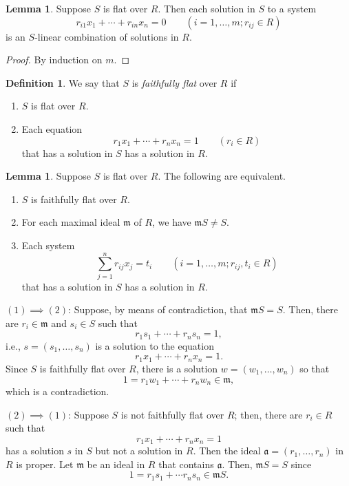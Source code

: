 \documentclass[12pt]{article}
\theoremstyle{theorem}            %
\theoremstyle{definition}           %
\newtheorem{definition}[theorem]{Definition}
\newtheorem{lemma}[theorem]{Lemma}
\theoremstyle{empty}
\begin{document}
\begin{lemma} Suppose $S$ is flat over $R$.  Then each solution in $S$ to a system
$$r_{i1}x_1 + \cdots + r_{in}x_n=0 \qquad (i=1, \dots, m ; r_{ij}\in R)$$
is an $S$-linear combination of solutions in $R$. \end{lemma}

\begin{proof} By induction on $m$.  \end{proof}

\begin{definition} We say that $S$ is \textit{faithfully flat} over $R$ if
\begin{enumerate}[$\bullet$]
\item $S$ is flat over $R$.
\item Each equation 
$$r_1x_1+\cdots +r_nx_n=1 \qquad (r_i\in R)$$
that has a solution in $S$ has a solution in $R$. \end{enumerate}
\end{definition}

\begin{lemma} Suppose $S$ is flat over $R$.  The following are equivalent.
\begin{enumerate}[(1)]
\item $S$ is faithfully flat over $R$.
\item For each maximal ideal $\mathfrak{m}$ of $R$, we have $\mathfrak{m}S\neq S$.
\item Each system 
\begin{equation} \sum_{j=1}^n r_{ij}x_j = t_i \qquad (i=1, \dots, m ; r_{ij}, t_i\in R) \tag{$*$} \end{equation}
that has a solution in $S$ has a solution in $R$. 
\end{enumerate} \end{lemma}

$(1)\implies(2)$: Suppose, by means of contradiction, that $\mathfrak{m}S=S$.  Then, there are $r_i\in \mathfrak{m}$ and $s_i\in S$ such that
$$r_1s_1+\cdots + r_n s_n = 1,$$
i.e., $s=(s_1, \dots, s_n)$ is a solution to the equation
$$r_1x_1 + \cdots + r_n x_n = 1.$$
Since $S$ is faithfully flat over $R$, there is a solution $w=(w_1, \dots, w_n)$ so that
$$1= r_1w_1+\cdots + r_n w_n \in \mathfrak{m},$$
which is a contradiction. 

$(2)\implies (1)$:  Suppose $S$ is not faithfully flat over $R$; then, there are $r_i\in R$ such that
$$r_1x_1+\cdots + r_n x_n=1$$
has a solution $s$ in $S$ but not a solution in $R$.  Then the ideal $\mathfrak{a}=(r_1, \dots, r_n)$ in $R$ is proper.  Let $\mathfrak{m}$ be an ideal in $R$ that contains $\mathfrak{a}$. Then, $\mathfrak{m}S=S$ since
$$1=r_1s_1+\cdots r_n s_n \in \mathfrak{m}S.$$
\end{document}
